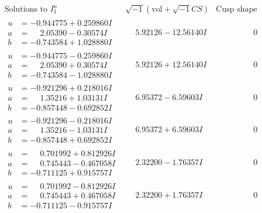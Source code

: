 \documentclass[1p]{elsarticle_modified}
\theoremstyle{definition}
\newcommand{\I}{\sqrt{-1}}
\begin{document}
$$\begin{array}{c|c|c}  
\text{Solutions to }I^u_{1}& \I (\text{vol} + \sqrt{-1}CS) & \text{Cusp shape}\\
 \hline 
\begin{aligned}
u &= -0.944775 + 0.259860 I \\
a &= \phantom{-}2.05390 - 0.30574 I \\
b &= -0.743584 + 1.028880 I\end{aligned}
 & \phantom{-}5.92126 - 12.56140 I & \phantom{-0.000000 } 0 \\ \hline\begin{aligned}
u &= -0.944775 - 0.259860 I \\
a &= \phantom{-}2.05390 + 0.30574 I \\
b &= -0.743584 - 1.028880 I\end{aligned}
 & \phantom{-}5.92126 + 12.56140 I & \phantom{-0.000000 } 0 \\ \hline\begin{aligned}
u &= -0.921296 + 0.218016 I \\
a &= \phantom{-}1.35216 + 1.03131 I \\
b &= -0.857448 - 0.692852 I\end{aligned}
 & \phantom{-}6.95372 - 6.59603 I & \phantom{-0.000000 } 0 \\ \hline\begin{aligned}
u &= -0.921296 - 0.218016 I \\
a &= \phantom{-}1.35216 - 1.03131 I \\
b &= -0.857448 + 0.692852 I\end{aligned}
 & \phantom{-}6.95372 + 6.59603 I & \phantom{-0.000000 } 0 \\ \hline\begin{aligned}
u &= \phantom{-}0.701992 + 0.812926 I \\
a &= \phantom{-}0.745443 - 0.467058 I \\
b &= -0.711125 + 0.915757 I\end{aligned}
 & \phantom{-}2.32200 - 1.76357 I & \phantom{-0.000000 } 0 \\ \hline\begin{aligned}
u &= \phantom{-}0.701992 - 0.812926 I \\
a &= \phantom{-}0.745443 + 0.467058 I \\
b &= -0.711125 - 0.915757 I\end{aligned}
 & \phantom{-}2.32200 + 1.76357 I & \phantom{-0.000000 } 0 \\ \hline\begin{aligned}

\end{aligned}
\end{array}$$
\end{document}
